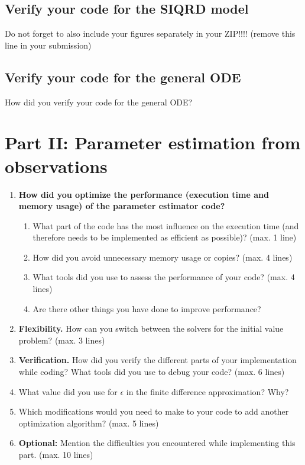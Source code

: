 \documentclass[a4paper]{article}
\newcommand{\answer}[1]{\vspace{-0.75em}\begin{framed} #1 \end{framed}\vspace{-0.75em}}
\begin{document}
\subsection*{Verify your code for the SIQRD model}
Do not forget to also include your figures separately in your ZIP!!!! (remove this line in your
submission)
\begin{figure}[!h]
	\centering
	\begin{subfigure}{0.32\linewidth}
		\centering
	\end{subfigure}
	\begin{subfigure}{0.32\linewidth}
		\centering
	\end{subfigure}
	\begin{subfigure}{0.32\linewidth}
		\centering
	\end{subfigure}
\end{figure}
\subsection*{Verify your code for the general ODE}
\answer{How did you verify your code for the general ODE?}
\section*{Part II: Parameter estimation from observations}
\begin{enumerate}[label={(II.\arabic*)}]
	\item \textbf{How did you optimize the performance (execution time and memory usage) of
the parameter estimator code?}
\begin{enumerate}
\item What part of the code has the most influence on the execution time (and therefore
needs to be implemented as efficient as possible)? (max. 1 line)
\answer{}
\item How did you avoid unnecessary memory usage or copies? (max. 4 lines)
\answer{}
\item What tools did you use to assess the performance of your code? (max. 4 lines)
\answer{}
\item Are there other things you have done to improve performance?
\answer{}
\end{enumerate}
	\item \textbf{Flexibility.} How can you switch between the solvers for the initial value problem? (max. 3 lines)
	\answer{}
	\item \textbf{Verification.} How did you verify the different parts of your implementation while coding? What tools did you use to debug your code? (max. 6 lines)
	\answer{}
	\item What value did you use for $\epsilon$ in the finite difference approximation? Why?
	\answer{}
	\item Which modifications would you need to make to your code to add another optimization algorithm? (max. 5 lines)
	\answer{}
	\item \textbf{Optional:} Mention the difficulties you encountered while implementing this part. (max.
10 lines)
	\answer{}
\end{enumerate}
\end{document}

